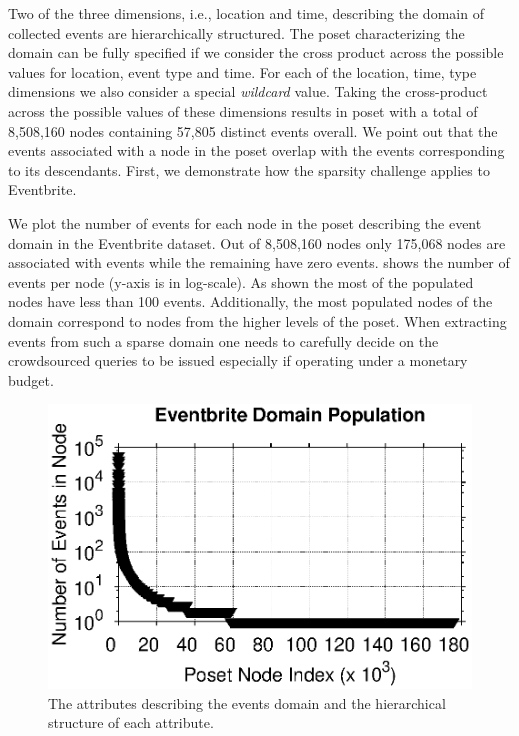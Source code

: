 Two of the three dimensions, i.e., location and time, describing the domain of collected events  are hierarchically structured. The poset characterizing the domain can be fully specified if we consider the cross product across the possible values for location, event type and time. For each of the location, time, type dimensions we also consider a special {\em wildcard} value. Taking the cross-product across the possible values of these dimensions results in poset with a total of 8,508,160 nodes containing 57,805 distinct events overall. We point out that the events associated with a node in the poset overlap with the events corresponding to its descendants. First, we demonstrate how the sparsity challenge applies to Eventbrite.
\begin{example}
We plot the number of events for each node in the poset describing the event domain in the Eventbrite dataset. Out of 8,508,160 nodes only 175,068 nodes are associated with events while the remaining have zero events.  shows the number of events per node (y-axis is in log-scale). As shown the most of the populated nodes have less than 100 events. Additionally, the most populated nodes of the domain correspond to nodes from the higher levels of the poset. When extracting events from such a sparse domain one needs to carefully decide on the crowdsourced queries to be issued especially if operating under a monetary budget.
\end{example}
\begin{figure}
	\begin{center}
	\includegraphics[clip,scale=0.5]{figs/eventbritepop.eps}
	\vspace{-15pt}
	\caption{The attributes describing the events domain and the hierarchical structure of each attribute.}
	\label{fig:eventbritepop}
	\vspace{-20pt}
	\end{center}
\end{figure}
